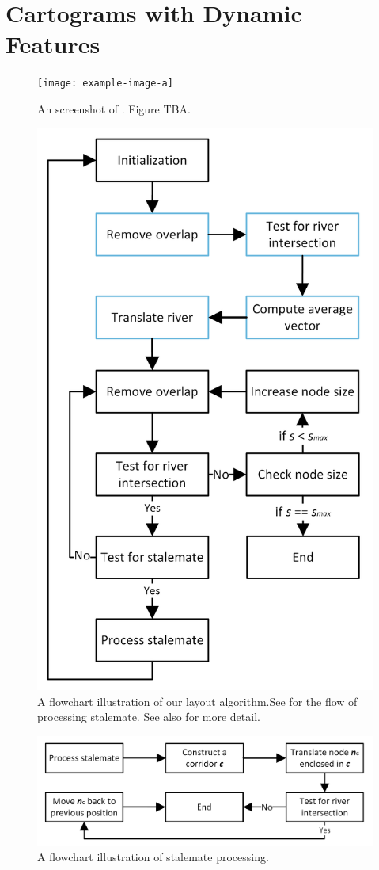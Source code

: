 \section{Cartograms with Dynamic Features}

 {
  \begin{figure}[tb!]
      \centering
      \texttt{[image: example-image-a]}
      \caption{An screenshot of \software. Figure TBA.}
      \label{fig:overview}
  \end{figure}
 }

 {
  \begin{figure}[tb!]
      \centering
      \includegraphics[width=0.8\columnwidth]{figure/flowchart.png}
      \caption{A flowchart illustration of our layout algorithm.See  for the flow of processing stalemate. See also  for more detail.}
      \label{fig:flowchart}
  \end{figure}

  \begin{figure}[tb!]
      \centering
      \includegraphics[width=0.9\columnwidth]{figure/flowchart stalemate.png}
      \caption{A flowchart illustration of stalemate processing.}
      \label{fig:flowchart-stalemate}
  \end{figure}
 }


